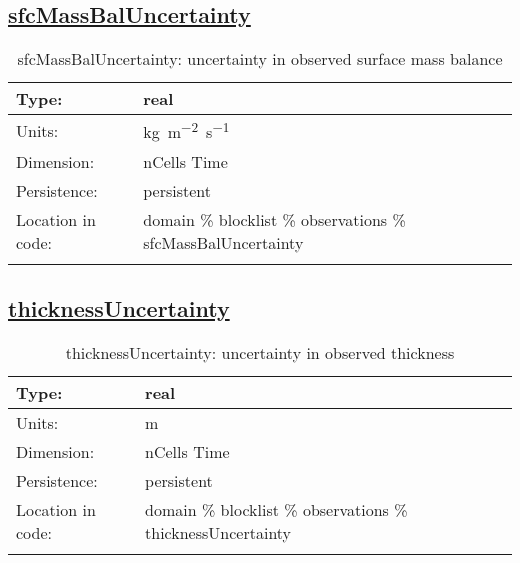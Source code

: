 \subsection[sfcMassBalUncertainty]{\hyperref[sec:var_tab_observations]{sfcMassBalUncertainty}}
\label{subsec:var_sec_observations_sfcMassBalUncertainty}
\begin{center}
\begin{longtable}{| p{2.0in} | p{4.0in} |}
        \hline 
        Type: & real \\
        \hline 
        Units: & \si{kg.m^{-2}.s^{-1}} \\
        \hline 
        Dimension: & nCells Time \\
        \hline 
        Persistence: & persistent \\
        \hline 
         Location in code: & domain \% blocklist \% observations \% sfcMassBalUncertainty \\
         \hline 
    \caption{sfcMassBalUncertainty: uncertainty in observed surface mass balance}
\end{longtable}
\end{center}
\subsection[thicknessUncertainty]{\hyperref[sec:var_tab_observations]{thicknessUncertainty}}
\label{subsec:var_sec_observations_thicknessUncertainty}
\begin{center}
\begin{longtable}{| p{2.0in} | p{4.0in} |}
        \hline 
        Type: & real \\
        \hline 
        Units: & \si{m} \\
        \hline 
        Dimension: & nCells Time \\
        \hline 
        Persistence: & persistent \\
        \hline 
         Location in code: & domain \% blocklist \% observations \% thicknessUncertainty \\
         \hline 
    \caption{thicknessUncertainty: uncertainty in observed thickness}
\end{longtable}
\end{center}
